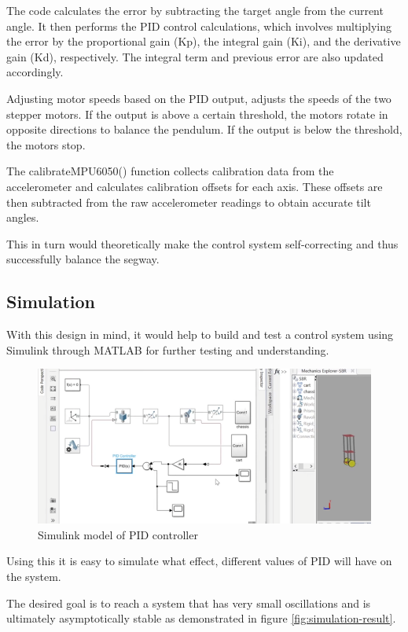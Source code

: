 The code calculates the error by subtracting the target angle from the current angle. It then performs the PID control calculations, which involves multiplying the error by the proportional gain (Kp), the integral gain (Ki), and the derivative gain (Kd), respectively. The integral term and previous error are also updated accordingly.

Adjusting motor speeds based on the PID output, adjusts the speeds of the two stepper motors. If the output is above a certain threshold, the motors rotate in opposite directions to balance the pendulum. If the output is below the threshold, the motors stop.

The calibrateMPU6050() function collects calibration data from the accelerometer and calculates calibration offsets for each axis. These offsets are then subtracted from the raw accelerometer readings to obtain accurate tilt angles.

This in turn would theoretically make the control system self-correcting and thus successfully balance the segway.

\newpage
\subsection{Simulation}

With this design in mind, it would help to build and test a control system using Simulink through MATLAB for further testing and understanding. 

\begin{figure}
    \centerline{\includegraphics[width=\textwidth]{images/simulink-diagram.png}}
    \caption{Simulink model of PID controller \cite{ref:balance_sim}}
\end{figure}

Using this it is easy to simulate what effect, different values of PID will have on the system. 

The desired goal is to reach a system that has very small oscillations and is \\
ultimately asymptotically stable as demonstrated in figure \ref{fig:simulation-result}.

